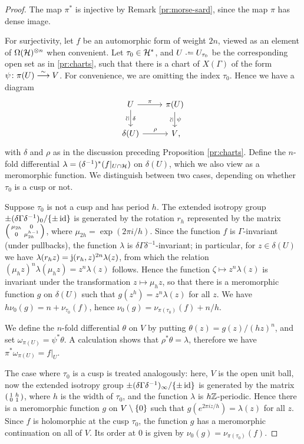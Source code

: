\begin{proof}
 The map $\pi^*$ is injective by Remark \ref{pr:morse-sard}, since the map $\pi$ has dense image.

 For surjectivity, let $f$ be an automorphic form of weight $2n$, viewed as an element of $\Omega(\mathcal{H})^{\otimes n}$ when convenient. Let $\tau_0\in\mathcal{H}^*$, and $U\defeq U_{\tau_0}$ be the corresponding open set as in \ref{pr:charts}, such that there is a chart of $X(\Gamma)$ of the form $\psi\colon \pi(U)\stackrel{\sim}{\longrightarrow} V$. For convenience, we are omitting the index $\tau_0$. Hence we have a diagram
 \[
 \begin{tikzcd}
  U \arrow{r}{\pi} \arrow{d}{\delta}[swap]{\rotatebox{90}{\(\simeq\)}} &
  \pi(U) \arrow{d}{\psi}[swap]{\rotatebox{90}{\(\simeq\)}} \\
  \delta(U) \arrow{r}{\rho} &
  V\rlap{,}
 \end{tikzcd}
 \]
 with $\delta$ and $\rho$ as in the discussion preceding Proposition \ref{pr:charts}. Define the $n$-fold differential $\lambda=(\delta^{-1})^*(f|_{U\cap\mathcal{H}})$ on $\delta(U)$, which we also view as a meromorphic function. We distinguish between two cases, depending on whether $\tau_0$ is a cusp or not.
 
 Suppose $\tau_0$ is not a cusp and has period $h$. The extended isotropy group $\pm(\delta\Gamma\delta^{-1})_0/\{\pm\operatorname{id}\}$ is generated by the rotation $r_h$ represented by the matrix $\left(\begin{smallmatrix}\mu_{2h}&0\\0&\mu_{2h}^{h-1}\end{smallmatrix}\right)$, where $\mu_{2h}=\exp(2\pi i/h)$. Since the function $f$ is $\Gamma$-invariant (under pullbacks), the function $\lambda$ is $\delta\Gamma\delta^{-1}$-invariant; in particular, for $z\in\delta(U)$ we have $\lambda(r_h z)=\mathrm{j}(r_h,z)^{2n}\lambda(z)$, from which the relation $(\mu_h z)^n\lambda(\mu_h z)=z^n \lambda(z)$ follows. Hence the function $\zeta\mapsto z^n\lambda(z)$ is invariant under the transformation $z\mapsto\mu_h z$, so that there is a meromorphic function $g$ on $\delta(U)$ such that $g(z^h)=z^n\lambda(z)$ for all $z$. We have $h\nu_0(g)=n+\nu_{\tau_0}(f)$, hence $\nu_0(g)=\nu_{\pi(\tau_0)}(f)+n/h$.
 
 We define the $n$-fold differential $\theta$ on $V$ by putting $\theta(z)=g(z)/(hz)^n$, and set $\omega_{\pi(U)}=\psi^*\theta$. A calculation shows that $\rho^*\theta=\lambda$, therefore we have $\pi^*\omega_{\pi(U)}=f|_U$.
 
 The case where $\tau_0$ is a cusp is treated analogously: here, $V$ is the open unit ball, now the extended isotropy group $\pm(\delta\Gamma\delta^{-1})_\infty/\{\pm\operatorname{id}\}$ is generated by the matrix $\left(\begin{smallmatrix}1&h\\0&1\end{smallmatrix}\right)$, where $h$ is the width of $\tau_0$, and the function $\lambda$ is $h\mathbb{Z}$-periodic. Hence there is a meromorphic function $g$ on $V\setminus\{0\}$ such that $g(e^{2\pi i z / h})=\lambda(z)$ for all $z$. Since $f$ is holomorphic at the cusp $\tau_0$, the function $g$ has a meromorphic continuation on all of $V$. Its order at $0$ is given by $\nu_0(g)=\nu_{\pi(\tau_0)}(f)$.
 

\end{proof}
